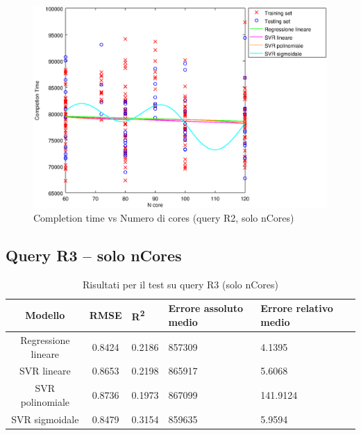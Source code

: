 \documentclass[a4paper,11pt]{article}
\begin{document}
\begin {figure}[hbtp]
\centering
\includegraphics[width=\textwidth]{output/R2_SOLO_CORE_FILTER_500000/plot_R2_-.eps}
\caption {Completion time vs Numero di cores (query R2, solo nCores)}
\end {figure}

\newpage
\subsection{Query R3 -- solo nCores}
\begin{table}[bhpt]
	\centering
	\begin{adjustbox}{center}
		\begin{tabular}{c | c M{1.2cm} M{2.5cm} M{2.5cm} M{1.8cm}}
			Modello & RMSE & R\textsuperscript{2} & Errore assoluto medio & Errore relativo medio \tabularnewline
			\hline
			Regressione lineare & 0.8424 & 0.2186 & 857309 & 4.1395 \\
			SVR lineare & 0.8653 & 0.2198 & 865917 & 5.6068 \\
			SVR polinomiale & 0.8736 & 0.1973 & 867099 & 141.9124 \\
			SVR sigmoidale & 0.8479 & 0.3154 & 859635 & 5.9594 \\
		\end{tabular}
	\end{adjustbox}
	\\
	\caption{Risultati per il test su query R3 
(solo nCores)}
	\label{table_R3_nCores}
\end{table}
\end{document}
